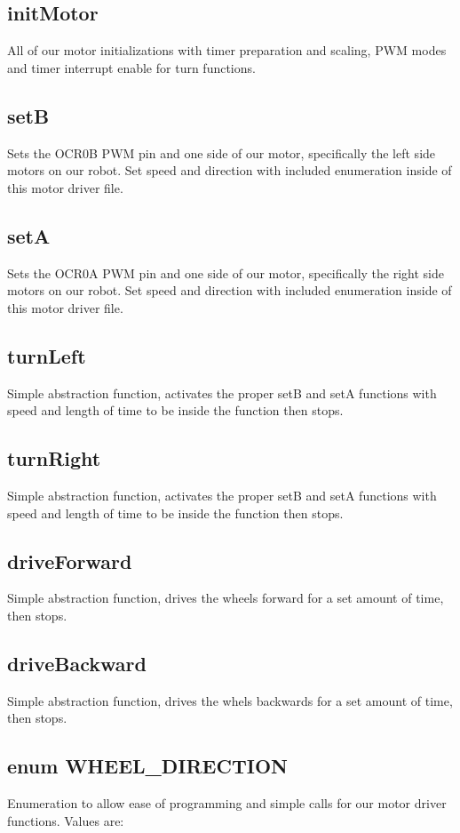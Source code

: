 \documentclass[letterpaper,11pt]{texMemo} %
\begin{document}
\subsection*{initMotor}
All of our motor initializations with timer preparation and 
scaling, PWM modes and timer interrupt enable for turn functions.

\subsection*{setB}
Sets the OCR0B PWM pin and one side of our motor, specifically the 
left side motors on our robot. Set speed and direction with included 
enumeration inside of this motor driver file.

\subsection*{setA}
Sets the OCR0A PWM pin and one side of our motor, specifically the 
right side motors on our robot. Set speed and direction with included 
enumeration inside of this motor driver file.

\subsection*{turnLeft}
Simple abstraction function, activates the proper setB and setA functions 
with speed and length of time to be inside the function then stops.

\subsection*{turnRight}
Simple abstraction function, activates the proper setB and setA functions 
with speed and length of time to be inside the function then stops.

\subsection*{driveForward}
Simple abstraction function, drives the wheels forward for a set amount 
of time, then stops.

\subsection*{driveBackward}
Simple abstraction function, drives the whels backwards for a set amount
of time, then stops.

\subsection*{enum WHEEL\_DIRECTION}
Enumeration to allow ease of programming and simple calls for our motor driver
functions. Values are: 
\end{document}
